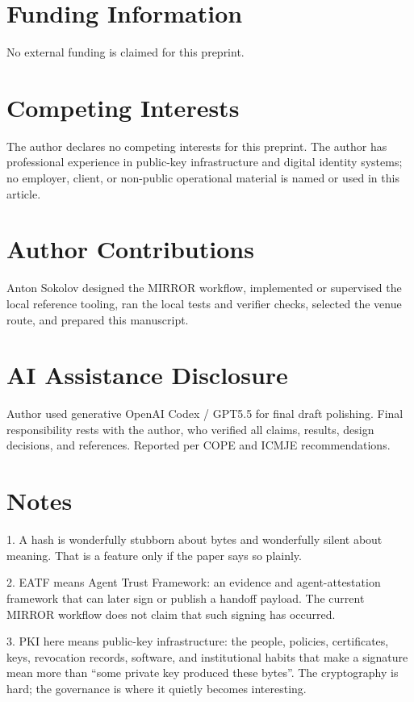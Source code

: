 \documentclass[10pt]{article}
\begin{document}
\section*{Funding Information}

No external funding is claimed for this preprint.

\section*{Competing Interests}

The author declares no competing interests for this preprint. The author has professional experience in public-key infrastructure and digital identity systems; no employer, client, or non-public operational material is named or used in this article.

\section*{Author Contributions}

Anton Sokolov designed the MIRROR workflow, implemented or supervised the local reference tooling, ran the local tests and verifier checks, selected the venue route, and prepared this manuscript.

\section*{AI Assistance Disclosure}

Author used generative OpenAI Codex / GPT5.5 for final draft polishing. Final responsibility rests with the author, who verified all claims, results, design decisions, and references. Reported per COPE and ICMJE recommendations.

\section*{Notes}

1. A hash is wonderfully stubborn about bytes and wonderfully silent about meaning. That is a feature only if the paper says so plainly.

2. EATF means Agent Trust Framework: an evidence and agent-attestation framework that can later sign or publish a handoff payload. The current MIRROR workflow does not claim that such signing has occurred.

3. PKI here means public-key infrastructure: the people, policies, certificates, keys, revocation records, software, and institutional habits that make a signature mean more than ``some private key produced these bytes''. The cryptography is hard; the governance is where it quietly becomes interesting.
\end{document}
